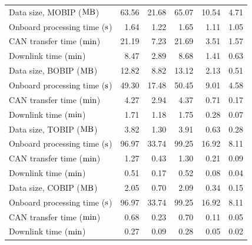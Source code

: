 \begin{table}[htbp]
\begin{tabular}{l r r r r r}
        \hline
        Data size, MOBIP ($\rm{MB}$) & 63.56 & 21.68 & 65.07 & 10.54 & 4.71 \\
        Onboard processing time ($\rm{s}$) & 1.64 & 1.22	& 1.65 & 1.11 & 1.05 \\
        CAN transfer time ($\rm{min}$) & 21.19 & 7.23 & 21.69	& 3.51 & 1.57 \\
        Downlink time ($\rm{min}$) & 8.47 & 2.89 &	8.68 &	1.41 & 0.63 \\
        \hline
        Data size, BOBIP ($\rm{MB}$) & 12.82 & 8.82 & 13.12 & 2.13 & 0.51 \\
        Onboard processing time ($\rm{s}$) & 49.30 & 17.48	& 50.45 & 9.01 & 4.58 \\
        CAN transfer time ($\rm{min}$) & 4.27 & 2.94 & 4.37 & 0.71 & 0.17 \\
        Downlink time ($\rm{min}$) & 1.71 & 1.18 & 1.75 & 0.28 & 0.07 \\
        \hline
        Data size, TOBIP ($\rm{MB}$) & 3.82 & 1.30 & 3.91 &	0.63 & 0.28 \\
        Onboard processing time ($\rm{s}$) & 96.97 & 33.74	& 99.25 & 16.92 & 8.11 \\
        CAN transfer time ($\rm{min}$) & 1.27 & 0.43 & 1.30 & 0.21 & 0.09 \\
        Downlink time ($\rm{min}$) & 0.51 & 0.17 & 0.52 & 0.08 & 0.04 \\
        \hline
        Data size, COBIP ($\rm{MB}$) & 2.05 & 0.70 & 2.09 &	0.34 & 0.15 \\
        Onboard processing time ($\rm{s}$) & 96.97 & 33.74	& 99.25 & 16.92 & 8.11 \\
        CAN transfer time ($\rm{min}$) & 0.68 & 0.23 & 0.70 & 0.11 & 0.05 \\
        Downlink time ($\rm{min}$) & 0.27 & 0.09 & 0.28 & 0.05 & 0.02 \\
        \hline
	\end{tabular}
\end{table}
